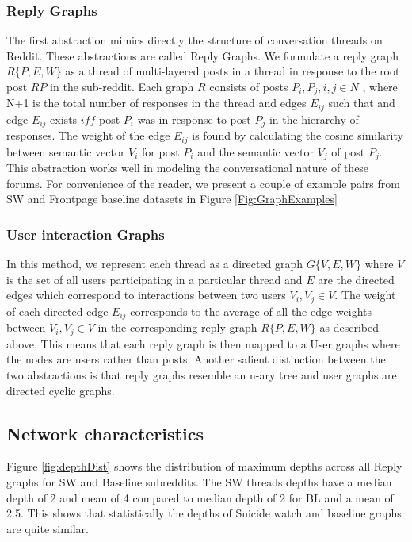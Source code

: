 \subsubsection{Reply Graphs}
\label{Sec:Reply_graphs}
The first abstraction mimics directly the structure of conversation threads on Reddit. These abstractions are called Reply Graphs. We formulate a reply graph $R\{P,E,W\}$ as a thread of multi-layered posts in a thread in response to the root post $RP$ in the sub-reddit. Each graph $R$ consists of posts $P_i , P_j , i,j \in N$ , where N+1 is the total number of responses in the thread and edges $E_{ij}$ such that and edge $E_{ij}$ exists $iff$ post $P_i$ was in response to post $P_j$ in the hierarchy of responses.  The weight of the edge $E_{ij}$ is found by calculating the cosine similarity between semantic vector $V_i$ for post $P_i$ and the semantic vector $V_j$ of post $P_j$.  This abstraction works well in modeling the conversational nature of these forums.  For convenience of the reader, we present a couple of example pairs from SW and Frontpage baseline datasets in Figure \ref{Fig:GraphExamples}

\subsubsection{User interaction Graphs}
\label{Sec:Interaction_graphs}
In this method, we represent each thread as a directed graph $G\{V,E,W\}$ where $V$ is the set of all users participating in a particular thread and $E$ are the directed  edges which correspond to interactions between two users $V_i , V_j  \in V$. The weight of each directed edge $E_{ij}$ corresponds to the average of all the edge weights between $V_i , V_j  \in V$ in the corresponding reply graph $R\{P,E,W\}$ as described above. This means that each reply graph is then mapped to a User graphs where the nodes are users rather than posts. Another salient distinction between the two abstractions is that reply graphs resemble an n-ary tree and user graphs are directed cyclic graphs. 


\subsection{Network characteristics}
Figure \ref{fig:depthDist} shows the distribution of maximum depths across all Reply graphs for SW and Baseline subreddits. The SW threads depths have a median depth of 2 and mean of 4 compared to median depth of 2 for BL and a mean of 2.5. This shows that statistically the depths of Suicide watch and baseline graphs are quite similar.


